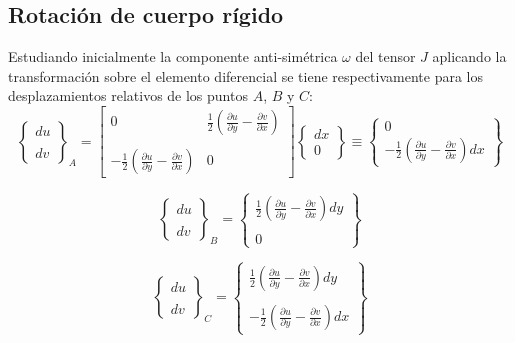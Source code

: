 \documentclass[../notas medios.tex]{subfiles}
\begin{document}
\subsection{Rotación de cuerpo rígido}
Estudiando inicialmente la componente anti-simétrica $\omega$ del tensor $J$ aplicando la transformación sobre el elemento diferencial se tiene respectivamente para los desplazamientos relativos de los puntos $A$, $B$ y $C$:
\[{\left\{ {\begin{array}{*{20}{c}}
{du}\\\\
{dv}
\end{array}} \right\}_A} = \left[ {\begin{array}{*{20}{c}}
0&{\frac{1}{2}\left( {\frac{{\partial u}}{{\partial y}} - \frac{{\partial v}}{{\partial x}}} \right)}\\\\
{ - \frac{1}{2}\left( {\frac{{\partial u}}{{\partial y}} - \frac{{\partial v}}{{\partial x}}} \right)}&0
\end{array}} \right]\left\{ {\begin{array}{*{20}{c}}
{dx}\\
0
\end{array}} \right\} \equiv \left\{ {\begin{array}{*{20}{c}}
0\\
{ - \frac{1}{2}\left( {\frac{{\partial u}}{{\partial y}} - \frac{{\partial v}}{{\partial x}}} \right)dx}
\end{array}} \right\}\]

\[{\left\{ {\begin{array}{*{20}{c}}
{du}\\\\
{dv}
\end{array}} \right\}_B} = \left\{ {\begin{array}{*{20}{c}}
{\frac{1}{2}\left( {\frac{{\partial u}}{{\partial y}} - \frac{{\partial v}}{{\partial x}}} \right)dy}\\\\
0
\end{array}} \right\}\]

\[{\left\{ {\begin{array}{*{20}{c}}
{du}\\\\
{dv}
\end{array}} \right\}_C} = \left\{ {\begin{array}{*{20}{c}}
{\frac{1}{2}\left( {\frac{{\partial u}}{{\partial y}} - \frac{{\partial v}}{{\partial x}}} \right)dy}\\\\
{ - \frac{1}{2}\left( {\frac{{\partial u}}{{\partial y}} - \frac{{\partial v}}{{\partial x}}} \right)dx}
\end{array}} \right\}\]
\end{document}
